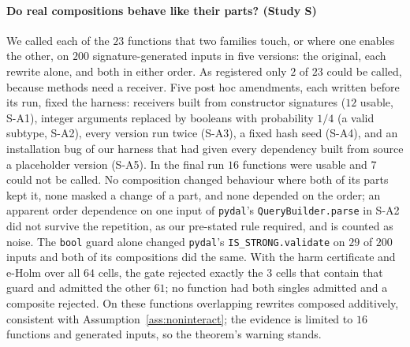 \paragraph{Do real compositions behave like their parts? (Study S)}
We called each of the $23$ functions that two families touch, or where one enables the other, on $200$ signature-generated inputs in
five versions: the original, each rewrite alone, and both in either order.  As registered only $2$ of $23$ could be called, because
methods need a receiver.  Five post hoc amendments, each written before its run, fixed the harness: receivers built from
constructor signatures ($12$ usable, S-A1), integer arguments replaced by booleans with probability $1/4$ (a valid subtype, S-A2),
every version run twice (S-A3), a fixed hash seed (S-A4), and an installation bug of our harness that had given every dependency
built from source a placeholder version (S-A5).  In the final run $16$ functions were usable and $7$ could not be called.  No
composition changed behaviour where both of its parts kept it, none masked a change of a part, and none depended on the order; an
apparent order dependence on one input of \texttt{pydal}'s \texttt{QueryBuilder.parse} in S-A2 did not survive the repetition, as
our pre-stated rule required, and is counted as noise.  The \texttt{bool} guard alone changed \texttt{pydal}'s
\texttt{IS\_STRONG.validate} on $29$ of $200$ inputs and both of its compositions did the same.  With the harm certificate and
e-Holm over all $64$ cells, the gate rejected exactly the $3$ cells that contain that guard and admitted the other $61$; no function had
both singles admitted and a composite rejected.  On these functions overlapping rewrites composed additively, consistent with
Assumption~\ref{ass:noninteract}; the evidence is limited to $16$ functions and generated inputs, so the theorem's warning stands.

